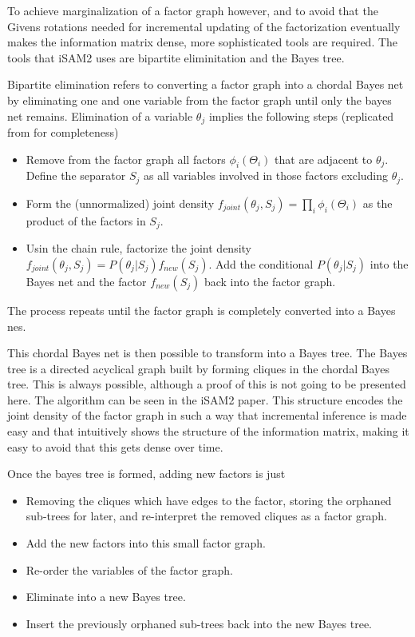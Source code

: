 To achieve marginalization of a factor graph however, and to avoid that the Givens rotations needed for incremental updating of the factorization eventually makes the information matrix dense, more sophisticated tools are required. The tools that iSAM2 uses are bipartite eliminitation\cite{BipartElim} and the Bayes tree\cite{BayesTree}. 

Bipartite elimination refers to converting a factor graph into a chordal Bayes net by eliminating one and one variable from the factor graph until only the bayes net remains. Elimination of a variable $\theta_j$ implies the following steps (replicated from \cite{iSAM2} for completeness)

\begin{itemize}
    \item Remove from the factor graph all factors $\phi_i(\Theta_i)$ that are adjacent to $\theta_j$. Define the separator $S_j$ as all variables involved in those factors excluding $\theta_j$.
    \item Form the (unnormalized) joint density $f_{joint}(\theta_j,S_j) = \prod_i\phi_i(\Theta_i)$ as the product of the factors in $S_j$.
    \item Usin the chain rule, factorize the joint density $f_{joint}(\theta_j, S_j) = P(\theta_j| S_j)f_{new}(S_j)$. Add the conditional $P(\theta_j|S_j)$ into the Bayes net and the factor $f_{new}(S_j)$ back into the factor graph.
\end{itemize}

The process repeats until the factor graph is completely converted into a Bayes nes.

This chordal Bayes net is then possible to transform into a Bayes tree. The Bayes tree is a directed acyclical graph built by forming cliques in the chordal Bayes tree. This is always possible, although a proof of this is not going to be presented here. The algorithm can be seen in the iSAM2 paper\cite{iSAM2}. This structure encodes the joint density of the factor graph in such a way that incremental inference is made easy and that intuitively shows the structure of the information matrix, making it easy to avoid that this gets dense over time.

Once the bayes tree is formed, adding new factors is just 

\begin{itemize}
    \item Removing the cliques which have edges to the factor, storing the orphaned sub-trees for later, and re-interpret the removed cliques as a factor graph.
    \item Add the new factors into this small factor graph.
    \item Re-order the variables of the factor graph.
    \item Eliminate into a new Bayes tree.
    \item Insert the previously orphaned sub-trees back into the new Bayes tree.
\end{itemize}

